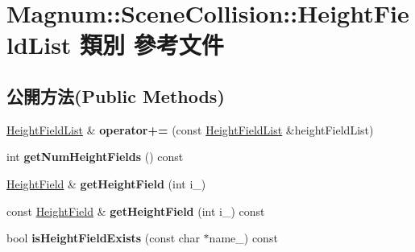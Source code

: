 \hypertarget{class_magnum_1_1_scene_collision_1_1_height_field_list}{}\section{Magnum\+:\+:Scene\+Collision\+:\+:Height\+Field\+List 類別 參考文件}
\label{class_magnum_1_1_scene_collision_1_1_height_field_list}
\subsection*{公開方法(Public Methods)}
\begin{DoxyCompactItemize}
\item 
\hyperlink{class_magnum_1_1_scene_collision_1_1_height_field_list}{Height\+Field\+List} \& {\bfseries operator+=} (const \hyperlink{class_magnum_1_1_scene_collision_1_1_height_field_list}{Height\+Field\+List} \&height\+Field\+List)\hypertarget{class_magnum_1_1_scene_collision_1_1_height_field_list_a6849b3ae1cf96237d24c429f394fa750}{}\label{class_magnum_1_1_scene_collision_1_1_height_field_list_a6849b3ae1cf96237d24c429f394fa750}

\item 
int {\bfseries get\+Num\+Height\+Fields} () const \hypertarget{class_magnum_1_1_scene_collision_1_1_height_field_list_a587b78afe8dd856e8c888aa239b64c82}{}\label{class_magnum_1_1_scene_collision_1_1_height_field_list_a587b78afe8dd856e8c888aa239b64c82}

\item 
\hyperlink{class_magnum_1_1_scene_collision_1_1_height_field}{Height\+Field} \& {\bfseries get\+Height\+Field} (int i\+\_\+)\hypertarget{class_magnum_1_1_scene_collision_1_1_height_field_list_a83f65a0c1a232158998e90ae8078b3ab}{}\label{class_magnum_1_1_scene_collision_1_1_height_field_list_a83f65a0c1a232158998e90ae8078b3ab}

\item 
const \hyperlink{class_magnum_1_1_scene_collision_1_1_height_field}{Height\+Field} \& {\bfseries get\+Height\+Field} (int i\+\_\+) const \hypertarget{class_magnum_1_1_scene_collision_1_1_height_field_list_a05087f9a496498e517f835c2e3a1a495}{}\label{class_magnum_1_1_scene_collision_1_1_height_field_list_a05087f9a496498e517f835c2e3a1a495}

\item 
bool {\bfseries is\+Height\+Field\+Exists} (const char $\ast$name\+\_\+) const \hypertarget{class_magnum_1_1_scene_collision_1_1_height_field_list_a9d11e984b2daa9a5bff5da75456de475}{}\label{class_magnum_1_1_scene_collision_1_1_height_field_list_a9d11e984b2daa9a5bff5da75456de475}


\end{DoxyCompactItemize}
